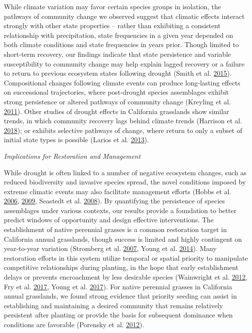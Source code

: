 \documentclass[twoside,12pt,final]{ucthesis-CA2012}
\begin{document}
\begin{ucmainmatter}
While climate variation may favor certain species groups in isolation, the pathways of community change we observed suggest that climatic effects interact strongly with other state properties -- rather than exhibiting a consistent relationship with precipitation, state frequencies in a given year depended on both climate conditions and state frequencies in years prior.
Though limited to short-term recovery, our findings indicate that state persistence and variable susceptibility to community change may help explain lagged recovery or a failure to return to previous ecosystem states following drought (Smith et al. \protect\hyperlink{ref-Smith2015}{2015}).
Compositional changes following climate events can produce long-lasting effects on successional trajectories, where post-drought species assemblages exhibit strong persistence or altered pathways of community change (Kreyling et al. \protect\hyperlink{ref-Kreyling2011}{2011}).
Other studies of drought effects in California grasslands show similar trends, in which community recovery lags behind climate trends (Harrison et al. \protect\hyperlink{ref-Harrison2018}{2018}); or exhibits selective pathways of change, where return to only a subset of initial state types is possible (Larios et al. \protect\hyperlink{ref-Larios2013}{2013}).

\emph{Implications for Restoration and Management}

While drought is often linked to a number of negative ecosystem changes, such as reduced biodiversity and invasive species spread, the novel conditions imposed by extreme climatic events may also facilitate management efforts (Hobbs et al. \protect\hyperlink{ref-Hobbs2006}{2006}, \protect\hyperlink{ref-Hobbs2009}{2009}, Seastedt et al. \protect\hyperlink{ref-Seastedt2008}{2008}).
By quantifying the persistence of species assemblages under various contexts, our results provide a foundation to better predict windows of opportunity and design effective interventions.
The establishment of native perennial grasses is a common restoration target in California annual grasslands, though success is limited and highly contingent on year-to-year variation (Stromberg et al. \protect\hyperlink{ref-Stromberg2007}{2007}, Young et al. \protect\hyperlink{ref-Young2014}{2014}).
Many restoration efforts in this system utilize temporal or spatial priority to manipulate competitive relationships during planting, in the hope that early establishment delays or prevents encroachment by less desirable species (Wainwright et al. \protect\hyperlink{ref-Wainwright2012}{2012}, Fry et al. \protect\hyperlink{ref-Fry2017}{2017}, Young et al. \protect\hyperlink{ref-Young2017}{2017}).
For native perennial grasses in California annual grasslands, we found strong evidence that priority seeding can assist in establishing and maintaining a desired community that remains relatively persistent after planting or provide the basis for subsequent dominance when conditions are favorable (Porensky et al. \protect\hyperlink{ref-Porensky2012}{2012}).


\end{ucmainmatter}
\end{document}
